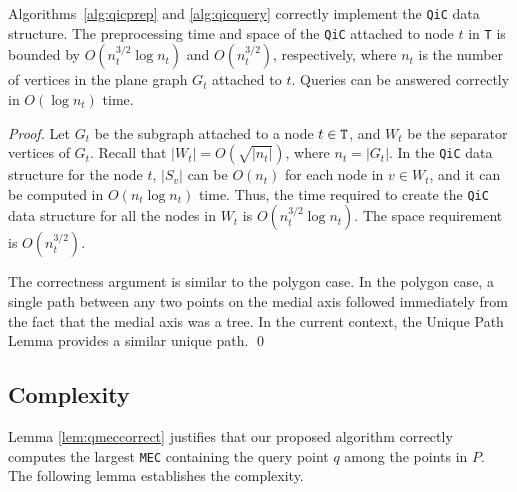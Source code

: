 \documentclass[12pt]{llncs}
\begin{document}
\begin{lemma}\label{lem:qic}
Algorithms\ \ref{alg:qicprep} and \ref{alg:qicquery} correctly implement the {\tt QiC} data structure.
The preprocessing time and space of the {\tt QiC} attached to node $t$ in {\tt T} is bounded by $O(n_t^{3/2} \log n_t)$ and $O(n_t^{3/2})$, respectively, where $n_t$ is the number of vertices in the plane graph $G_t$ attached to $t$. Queries can be answered correctly in $O(\log n_t)$ time.
\end{lemma}
\begin{proof}
Let $G_t$ be the subgraph attached to a node $t \in 
\tt T$, and $W_t$ be the separator vertices of $G_t$. Recall that $|W_t| = O(
\sqrt{|n_t|})$, where $n_t = |G_t|$. In the {\tt QiC} data structure 
for the node $t$, $|S_v|$ can be $O(n_t)$ for each node in $v \in W_t$, 
and it can be computed in $O(n_t\log n_t)$ time. Thus, the time required 
to create the {\tt QiC} data structure for all the nodes in $W_t$ is 
$O(n_t^{3/2}\log n_t)$. The space requirement is $O(n_t^{3/2})$. 

The correctness argument is similar to the polygon case. In the polygon case, a single path between any two points on the medial axis followed immediately from the fact that the medial axis was a tree. In the current context, the Unique Path Lemma provides a similar unique path. 
\qed
\end{proof}


\subsection{Complexity}\label{cc}

Lemma \ref{lem:qmeccorrect} justifies that our proposed algorithm correctly computes 
the 
largest {\tt MEC} containing the query point $q$ among the points in $P$. The 
following 
lemma establishes the  complexity.
\end{document}
